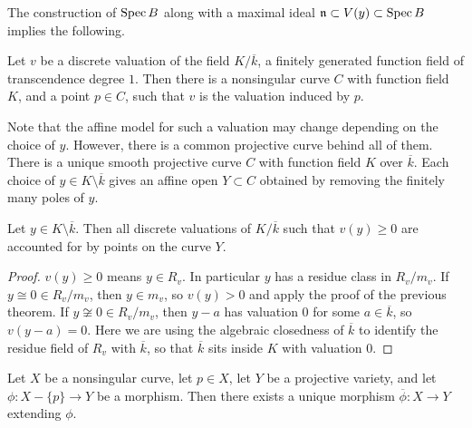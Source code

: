 \documentclass[12pt]{article}
\begin{document}
The construction of $\operatorname{Spec} B$ along with a maximal ideal $\mathfrak n \subset V(y)\subset \operatorname{Spec} B$ implies the following.
\begin{corollary}
    Let $v$ be a discrete valuation of the field $K/\overline{k}$, a finitely generated function field of transcendence degree $1$. Then there is a nonsingular curve $C$ with function field $K$, and a point $p \in C$, such that $v$ is the valuation induced by $p$.
\end{corollary}

Note that the affine model for such a valuation may change depending on the choice of $y$. However, there is a common projective curve behind all of them. There is a unique smooth projective curve $C$ with function field $K$ over $\overline{k}$. Each choice of $y\in K\setminus \overline{k}$ gives an affine open $Y \subset C$ obtained by removing the finitely many poles of $y$.

\begin{corollary}
    Let $y\in K\setminus \overline{k}$. Then all discrete valuations of $K/\overline{k}$ such that $v(y) \ge 0$ are accounted for by points on the curve $Y$.
\end{corollary}

\begin{proof}
    $v(y)\ge 0$ means $y\in R_v$. In particular $y$ has a residue class in $R_v/m_v$. If $y\cong 0 \in R_v/m_v$, then $y\in m_v$, so $v(y)>0$ and apply the proof of the previous theorem. If $y\not\cong 0 \in R_v/m_v$, then $y-a$ has valuation $0$ for some $a\in \overline{k}$, so $v(y-a)=0$. Here we are using the algebraic closedness of $\overline{k}$ to identify the residue field of $R_v$ with $\overline{k}$, so that $\overline{k}$ sits inside $K$ with valuation $0$.
\end{proof}

\begin{theorem}
    Let $X$ be a nonsingular curve, let $p\in X$, let $Y$ be a projective variety, and let $\phi\colon X-\{p\}\to Y$
    be a morphism. Then there exists a unique morphism $\overline{\phi}\colon X\to Y$ extending $\phi$.
\end{theorem}
\end{document}
